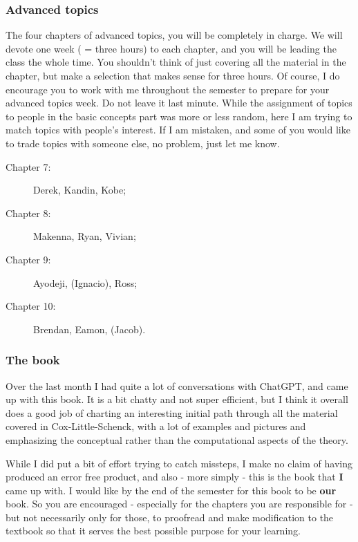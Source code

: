 \subsubsection*{Advanced topics}
The four chapters of advanced topics, you will be completely in charge. We will devote one week ( = three hours) to each chapter, and you will be leading the class the whole time. You shouldn't think of just covering all the material in the chapter, but make a selection that makes sense for three hours. Of course, I do encourage you to work with me throughout the semester to prepare for your advanced topics week. Do not leave it last minute. While the assignment of topics to people in the basic concepts part was more or less random, here I am trying to match topics with people's interest. If I am mistaken, and some of you would like to trade topics with someone else, no problem, just let me know.

\begin{description}
    \item[Chapter 7:] Derek, Kandin, Kobe;
    \item[Chapter 8:] Makenna, Ryan, Vivian;
    \item[Chapter 9:] Ayodeji, (Ignacio),   Ross;
    \item[Chapter 10:] Brendan, Eamon, (Jacob).
\end{description}

\subsubsection*{The book}

Over the last month I had quite a lot of conversations with ChatGPT, and came up with this book. It is a bit chatty and not super efficient, but I think it overall does a good job of charting an interesting initial path through all the material covered in Cox-Little-Schenck, with a lot of examples and pictures and emphasizing the conceptual rather than the computational aspects of the theory.

While I did put a bit of effort trying to catch missteps, I make no claim of having produced an error free product, and also - more simply - this is the book that {\bf I} came up with. I would like by the end of the semester for this book to be {\bf our} book. So you are encouraged - especially for the chapters you are responsible for - but not necessarily only for those, to proofread and make modification to the textbook so that it serves the best possible purpose for your learning.

